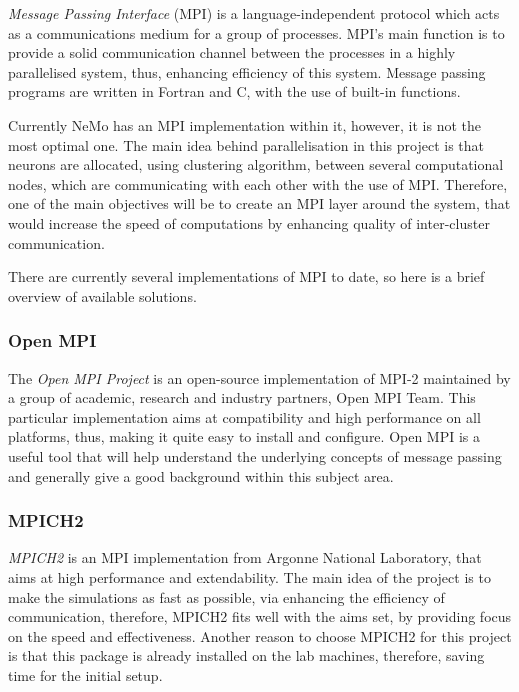 \emph{Message Passing Interface} (MPI) is a language-independent protocol which acts as a communications medium for a group of processes.\cite{mpi} MPI's main function is to provide
a solid communication channel between the processes in a highly parallelised system, thus, enhancing efficiency of this system. Message passing programs are written in Fortran and 
C, with the use of built-in functions.

Currently NeMo has an MPI implementation within it, however, it is not the most optimal one. The main idea behind parallelisation in this project is that neurons are allocated, 
using clustering algorithm, between several computational nodes, which are communicating with each other with the use of MPI. Therefore, one of the main objectives will be to 
create an MPI layer around the system, that would increase the speed of computations by enhancing quality of inter-cluster communication.

There are currently several implementations of MPI to date, so here is a brief overview of available solutions.

\subsubsection{Open MPI}

The \emph{Open MPI Project} is an open-source implementation of MPI-2 maintained by a group of academic, research and industry partners, Open MPI Team.\cite{RichardL.Graham2005} This particular 
implementation aims at compatibility and high performance on all platforms, thus, making it quite easy to install and configure. Open MPI is a useful tool that will help understand 
the underlying concepts of message passing and generally give a good background within this subject area.

\subsubsection{MPICH2}

\emph{MPICH2} is an MPI implementation from Argonne National Laboratory, that aims at high performance and extendability.\cite{W.Gropp1999} The main idea of the project is to make the simulations as
fast as possible, via enhancing the efficiency of communication, therefore, MPICH2 fits well with the aims set, by providing focus on the speed and effectiveness. Another reason to choose 
MPICH2 for this project is that this package is already installed on the lab machines, therefore, saving time for the initial setup.\cite{W.Gropp1999a}

